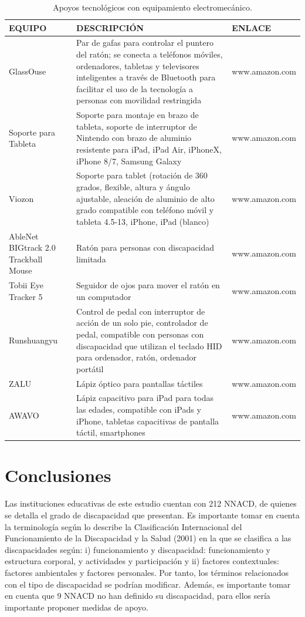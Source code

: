 \documentclass[spanish]{textolivre}
\begin{document}
\begin{table}[h!]
\centering
\begin{threeparttable}
\caption{Apoyos tecnológicos con equipamiento electromecánico.}
\label{tab06}
\centering
\begin{tabular}{p{} p{} p{}}
\toprule
EQUIPO & DESCRIPCIÓN & ENLACE \\
\midrule
GlassOuse & Par de gafas para controlar el puntero del ratón; se conecta a teléfonos móviles, ordenadores, tabletas y televisores inteligentes a través de Bluetooth para facilitar el uso de la tecnología a personas con movilidad restringida & www.amazon.com \\
Soporte para Tableta & Soporte para montaje en brazo de tableta, soporte de interruptor de Nintendo con brazo de aluminio resistente para iPad, iPad Air, iPhoneX, iPhone 8/7, Samsung Galaxy & www.amazon.com \\
Viozon & Soporte para tablet (rotación de 360 grados, flexible, altura y ángulo ajustable, aleación de aluminio de alto grado compatible con teléfono móvil y tableta 4.5-13, iPhone, iPad (blanco) & www.amazon.com \\
AbleNet BIGtrack 2.0 Trackball Mouse & Ratón para personas con discapacidad limitada & www.amazon.com \\
Tobii Eye Tracker 5 & Seguidor de ojos para mover el ratón en un computador & www.amazon.com \\
Runshuangyu & Control de pedal con interruptor de acción de un solo pie, controlador de pedal, compatible con personas con discapacidad que utilizan el teclado HID para ordenador, ratón, ordenador portátil & www.amazon.com \\
ZALU & Lápiz óptico para pantallas táctiles & www.amazon.com \\
AWAVO & Lápiz capacitivo para iPad para todas las edades, compatible con iPads y iPhone, tabletas capacitivas de pantalla táctil, smartphones & www.amazon.com \\
\bottomrule
\end{tabular}
\end{threeparttable}
\end{table}

\section{Conclusiones}\label{sec-organizacao}
Las instituciones educativas de este estudio cuentan con 212 NNACD, de quienes se detalla el grado de discapacidad que presentan. Es importante tomar en cuenta la terminología según lo describe la Clasificación Internacional del Funcionamiento de la Discapacidad y la Salud (2001) en la que se clasifica a las discapacidades según: i) funcionamiento y discapacidad: funcionamiento y estructura corporal, y actividades y participación y ii) factores contextuales: factores ambientales y factores personales. Por tanto, los términos relacionados con el tipo de discapacidad se podrían modificar. Además, es importante tomar en cuenta que 9 NNACD no han definido su discapacidad, para ellos sería importante proponer medidas de apoyo.
\end{document}

